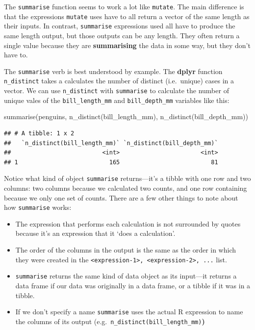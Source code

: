 \documentclass[
]{book}
\newenvironment{Shaded}{\begin{snugshade}}{\end{snugshade}}
\newcommand{\FunctionTok}[1]{\textcolor[rgb]{0.00,0.00,0.00}{#1}}
\newcommand{\NormalTok}[1]{#1}
\providecommand{\tightlist}{%
  \setlength{\itemsep}{0pt}\setlength{\parskip}{0pt}}
\begin{document}
The \texttt{summarise} function seems to work a lot like \texttt{mutate}. The main difference is that the expressions \texttt{mutate} uses have to all return a vector of the same length as their inputs. In contrast, \texttt{summarise} expressions used all have to produce the same length output, but those outputs can be any length. They often return a single value because they are \textbf{summarising} the data in some way, but they don't have to.

The \texttt{summarise} verb is best understood by example. The \textbf{dplyr} function \texttt{n\_distinct} takes a calculates the number of distinct (i.e.~unique) cases in a vector. We can use \texttt{n\_distinct} with \texttt{summarise} to calculate the number of unique vales of the \texttt{bill\_length\_mm} and \texttt{bill\_depth\_mm} variables like this:

\begin{Shaded}
\begin{Highlighting}[]
\FunctionTok{summarise}\NormalTok{(penguins, }\FunctionTok{n\_distinct}\NormalTok{(bill\_length\_mm), }\FunctionTok{n\_distinct}\NormalTok{(bill\_depth\_mm))}
\end{Highlighting}
\end{Shaded}

\begin{verbatim}
## # A tibble: 1 x 2
##   `n_distinct(bill_length_mm)` `n_distinct(bill_depth_mm)`
##                          <int>                       <int>
## 1                          165                          81
\end{verbatim}

Notice what kind of object \texttt{summarise} returns---it's a tibble with one row and two columns: two columns because we calculated two counts, and one row containing because we only one set of counts. There are a few other things to note about how \texttt{summarise} works:

\begin{itemize}
\tightlist
\item
  The expression that performs each calculation is not surrounded by quotes because it's an expression that it `does a calculation'.
\item
  The order of the columns in the output is the same as the order in which they were created in the \texttt{\textless{}expression-1\textgreater{},\ \textless{}expression-2\textgreater{},\ ...} list.
\item
  \texttt{summarise} returns the same kind of data object as its input---it returns a data frame if our data was originally in a data frame, or a tibble if it was in a tibble.
\item
  If we don't specify a name \texttt{summarise} uses the actual R expression to name the columns of its output (e.g.~\texttt{n\_distinct(bill\_length\_mm)}\textbf{)}
\end{itemize}
\end{document}
